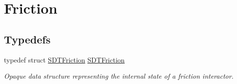 \hypertarget{group__friction}{}\section{Friction}
\label{group__friction}
\subsection*{Typedefs}
\begin{DoxyCompactItemize}
\item 
\hypertarget{group__friction_ga7d67f5fd1c67b9282542c959789178a8}{}typedef struct \hyperlink{group__friction_ga7d67f5fd1c67b9282542c959789178a8}{S\+D\+T\+Friction} \hyperlink{group__friction_ga7d67f5fd1c67b9282542c959789178a8}{S\+D\+T\+Friction}\label{group__friction_ga7d67f5fd1c67b9282542c959789178a8}

\begin{DoxyCompactList}\small\item\em Opaque data structure representing the internal state of a friction interactor. \end{DoxyCompactList}\end{DoxyCompactItemize}
